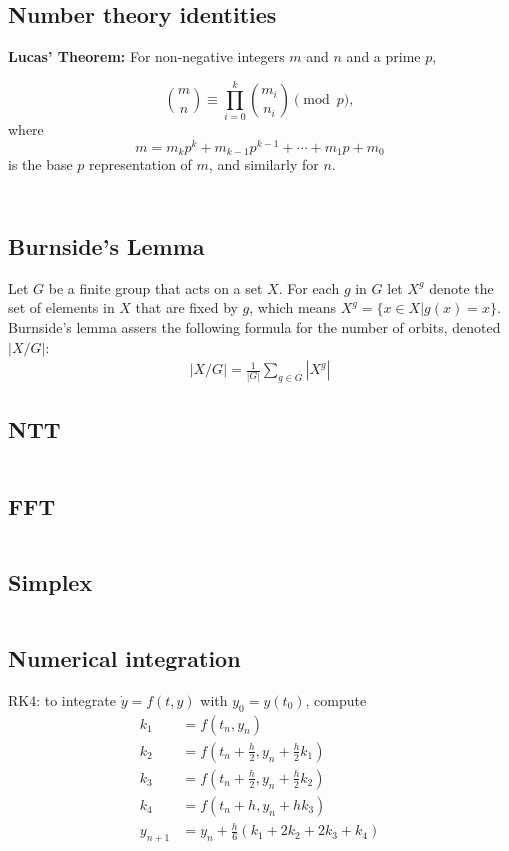 \documentclass[letterpaper,landscape]{article}
\begin{document}
\begin{multicols*}{2}
  \subsection{Number theory identities}
 \textbf{Lucas' Theorem:} For non-negative integers $m$ and $n$ and a prime $p$,
 
 $$\binom{m}{n}\equiv\prod_{i=0}^k\binom{m_i}{n_i}\pmod p,$$
where
$$m=m_kp^k+m_{k-1}p^{k-1}+\cdots +m_1p+m_0$$
is the base $p$ representation of $m$, and similarly for $n$.
  
  \inputminted{cpp}{src/math_finite_fields.cpp}
  \inputminted{cpp}{src/primes.cpp}
  
  \subsection{Burnside's Lemma}
  Let $G$ be a finite group that acts on a set $X$. For each $g$ in $G$ let $X^g$ denote the set of elements in $X$ that are fixed by $g$, which means $X^g=\{x\in X| g(x)=x\}$. Burnside's lemma assers the following formula for the number of orbits, denoted $|X/G|$:
  \begin{align*}
  |X/G|=\frac{1}{|G|} \sum_{g\in G} |X^g|
  \end{align*}
  
  \subsection{NTT}
  \inputminted{cpp}{src/math_ntt.cpp}

  \subsection{FFT}
  \inputminted{cpp}{src/math_fft.cpp}

  \subsection{Simplex}
  \inputminted{cpp}{src/math_simplex.cpp}

  \subsection{Numerical integration}
  RK4: to integrate $\dot{y} = f(t, y)$ with $y_0 = y(t_0)$, compute
  \begin{align*}
  	k_1 &= f(t_n, y_n) \\
    k_2 &= f(t_n + \frac h 2, y_n + \frac h 2 k_1) \\
    k_3 &= f(t_n + \frac h 2, y_n + \frac h 2 k_2) \\
    k_4 &= f(t_n + h, y_n + h k_3) \\
    y_{n+1} &= y_n + \frac h 6 (k_1 + 2k_2 + 2k_3 + k_4) 
  \end{align*}
  

\end{multicols*}
\end{document}

